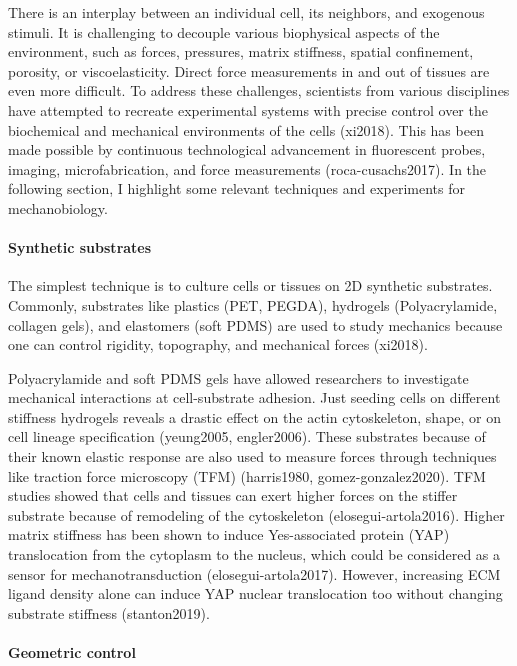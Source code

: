 \documentclass[
]{article}
\begin{document}
There is an interplay between an individual cell, its neighbors, and
exogenous stimuli. It is challenging to decouple various biophysical
aspects of the environment, such as forces, pressures, matrix stiffness,
spatial confinement, porosity, or viscoelasticity. Direct force
measurements in and out of tissues are even more difficult. To address
these challenges, scientists from various disciplines have attempted to
recreate experimental systems with precise control over the biochemical
and mechanical environments of the cells (xi2018). This has been made
possible by continuous technological advancement in fluorescent probes,
imaging, microfabrication, and force measurements (roca-cusachs2017). In
the following section, I highlight some relevant techniques and
experiments for mechanobiology.

\hypertarget{synthetic-substrates}{%
\paragraph{Synthetic substrates}\label{synthetic-substrates}}

The simplest technique is to culture cells or tissues on 2D synthetic
substrates. Commonly, substrates like plastics (PET, PEGDA), hydrogels
(Polyacrylamide, collagen gels), and elastomers (soft PDMS) are used to
study mechanics because one can control rigidity, topography, and
mechanical forces (xi2018).

Polyacrylamide and soft PDMS gels have allowed researchers to
investigate mechanical interactions at cell-substrate adhesion. Just
seeding cells on different stiffness hydrogels reveals a drastic effect
on the actin cytoskeleton, shape, or on cell lineage specification
(yeung2005, engler2006). These substrates because of their known elastic
response are also used to measure forces through techniques like
traction force microscopy (TFM) (harris1980, gomez-gonzalez2020). TFM
studies showed that cells and tissues can exert higher forces on the
stiffer substrate because of remodeling of the cytoskeleton
(elosegui-artola2016). Higher matrix stiffness has been shown to induce
Yes-associated protein (YAP) translocation from the cytoplasm to the
nucleus, which could be considered as a sensor for mechanotransduction
(elosegui-artola2017). However, increasing ECM ligand density alone can
induce YAP nuclear translocation too without changing substrate
stiffness (stanton2019).

\hypertarget{geometric-control}{%
\paragraph{Geometric control}\label{geometric-control}}
\end{document}
